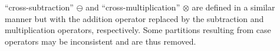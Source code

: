 ``cross-subtraction'' {\footnotesize$\ominus$} and ``cross-multiplication'' {\footnotesize$\otimes$} are defined in a similar manner but with the addition operator replaced by the subtraction and multiplication operators, respectively. Some partitions resulting from case operators may be inconsistent and are thus removed.

%

